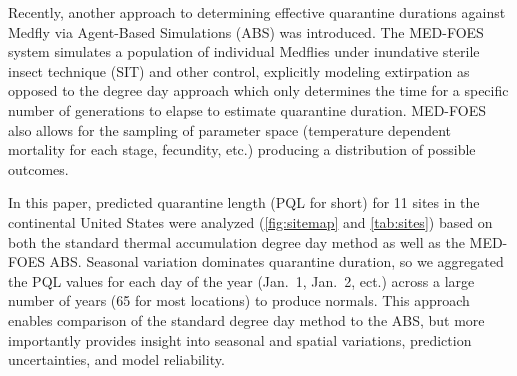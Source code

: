 \documentclass[10pt,a4paper,twocolumn]{article}
\begin{document}
Recently, another approach to determining effective quarantine 
durations against Medfly via Agent-Based Simulations (ABS)\cite{manoukis_agent-based_2014}
was introduced. 
The MED-FOES system simulates a population of individual Medflies 
under inundative sterile insect technique (SIT) and other control, 
explicitly modeling extirpation as opposed to the degree day 
approach which only determines the time for a specific
number of generations to elapse to estimate quarantine duration.
MED-FOES also allows for the sampling of parameter space
(temperature dependent mortality for each stage, fecundity, etc.)
producing a distribution of possible outcomes.

In this paper, predicted quarantine length (PQL for short) 
for 11 sites in the continental United States were analyzed
(\autoref{fig:sitemap} and \autoref{tab:sites})
based on both the standard thermal accumulation degree day method\cite{ECY:ECY1969503514} 
as well as the MED-FOES ABS\cite{manoukis_computer_2014}. 
Seasonal variation dominates quarantine duration, 
so we aggregated the PQL values for each day of the year 
(Jan.\ 1, Jan.\ 2, ect.) %
across a large number of years (65 for most locations) to produce normals.
This approach enables comparison of the standard degree day 
method to the ABS, but more importantly provides insight 
into seasonal and spatial variations, prediction uncertainties, 
and model reliability.


% 
% 
\end{document}
